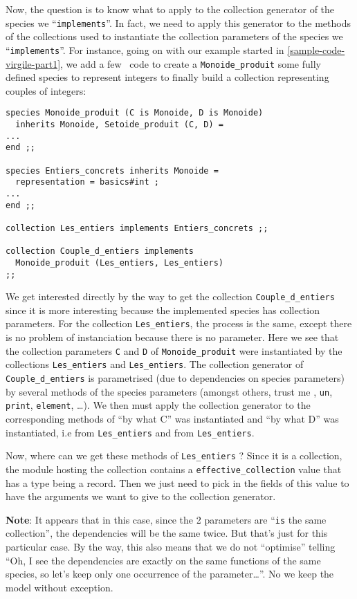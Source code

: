 Now, the question is to know what to apply to the collection generator
of the species we ``{\tt implements}''. In fact, we need to apply this
generator to the methods of the collections used to instantiate the
collection parameters of the species we ``{\tt implements}''.
For instance, going on with our example started in
\ref{sample-code-virgile-part1}, we add a few \focalize\ code to
create a {\tt Monoide\_produit} some fully defined species to
represent integers to finally build a collection representing couples
of integers:
{\footnotesize
\begin{lstlisting}[title=More \focalize\ code to create collections]
species Monoide_produit (C is Monoide, D is Monoide)
  inherits Monoide, Setoide_produit (C, D) =
...
end ;;

species Entiers_concrets inherits Monoide =
  representation = basics#int ;
...
end ;;

collection Les_entiers implements Entiers_concrets ;;

collection Couple_d_entiers implements
  Monoide_produit (Les_entiers, Les_entiers)
;;
\end{lstlisting}
}
We get interested directly by the way to get the collection
{\tt Couple\_d\_entiers} since it is more interesting because the
implemented species has collection parameters. For the collection
{\tt Les\_entiers}, the process is the same, except there is no
problem of instanciation because there is no parameter.
Here we see that the collection parameters {\tt C} and {\tt D} of
{\tt Monoide\_produit} were instantiated by the collections
{\tt Les\_entiers} and {\tt Les\_entiers}. The collection generator of
{\tt Couple\_d\_entiers} is parametrised (due to dependencies on
species parameters) by several methods of the species parameters
(amongst others, trust me \smiley, {\tt un}, {\tt print},
{\tt element}, \ldots).
We then must apply the collection generator to the corresponding
methods of ``by what C'' was instantiated and ``by what D'' was
instantiated, i.e from {\tt Les\_entiers} and from
{\tt Les\_entiers}.

Now, where can we get these methods of {\tt Les\_entiers} ? Since it is
a collection, the module hosting the collection contains a
{\tt effective\_collection} value that has a type being a record. Then
we just need to pick in the fields of this value to have the arguments
we want to give to the collection generator.

\medskip
{\bf Note}: It appears that in this case, since the 2
parameters are ``{\tt is} the same collection'', the dependencies will
be the same twice. But that's just for this particular case. By the
way, this also means that we do not ``optimise'' telling ``Oh, I see
the dependencies are exactly on the same functions of the same species,
so let's keep only one occurrence of the parameter\ldots''. No we keep
the model without exception.

